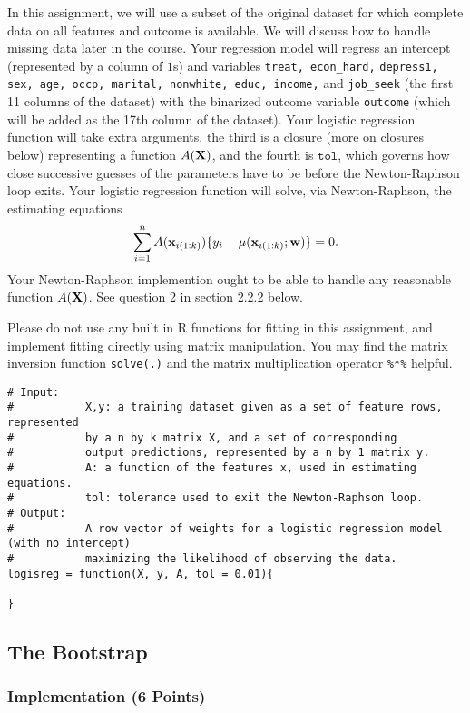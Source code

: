 \documentclass[11pt]{article}
\begin{document}
In this assignment, we will use a subset of the original dataset for which complete data on all
features and outcome is available.  We will discuss how to handle missing data later in the course.
Your regression model will regress an intercept (represented by a column of $1$s) and variables
\texttt{treat, econ\_hard,} \texttt{depress1, sex, age, occp, marital, nonwhite, educ, income,} and
\texttt{job\_seek} (the first 11 columns of the dataset) with the binarized outcome variable \texttt{outcome} (which will
be added as the 17th column of the dataset).  Your logistic regression function will take extra arguments,
the third is a closure (more on closures below) representing a function $A({\bf X})$, and the fourth is $\texttt{tol}$,
which governs how close successive guesses of the parameters have to be before the Newton-Raphson loop exits.
Your logistic regression function will solve, via Newton-Raphson, the estimating equations
\[
\sum_{i=1}^n A({\bf x}_{i(1:k)}) \{ y_i - \mu({\bf x}_{i(1:k)}; {\bf w})\} = 0.
\]
Your Newton-Raphson implemention ought to be able to handle any reasonable function $A({\bf X})$.  See question 2 in section 2.2.2 below.

Please do not use any built in R functions for fitting in this assignment,
and implement fitting directly using matrix manipulation.  You may find the matrix inversion function
\texttt{solve(.)} and the matrix multiplication operator \texttt{\%*\%} helpful.

\begin{lstlisting}
# Input:
#           X,y: a training dataset given as a set of feature rows, represented
#           by a n by k matrix X, and a set of corresponding
#           output predictions, represented by a n by 1 matrix y.
#           A: a function of the features x, used in estimating equations.
#           tol: tolerance used to exit the Newton-Raphson loop.
# Output:
#           A row vector of weights for a logistic regression model (with no intercept)
#           maximizing the likelihood of observing the data.
logisreg = function(X, y, A, tol = 0.01){

}
\end{lstlisting}

\subsection{The Bootstrap}

\subsubsection{Implementation (6 Points)}
\end{document}
